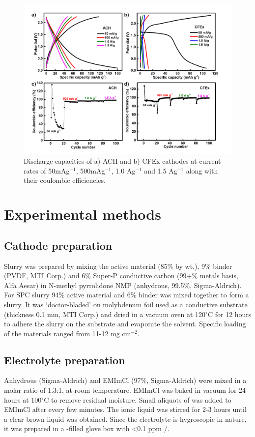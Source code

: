 \begin{figure}[tbh!]
  \centering
  \includegraphics[width=\textwidth]{Figures/chap5fig/cfexachlong}
    \caption{Discharge capacities of a) ACH and b) CFEx cathodes at current rates of 50mAg$^{-1}$, 500mAg$^{-1}$, 1.0 Ag$^{-1}$ and 1.5 Ag$^{-1}$ along with their coulombic efficiencies. }
  \label{Figures/chap5fig:cfexachlong}
\end{figure}

\section{Experimental methods}

\subsection{Cathode preparation}
Slurry was prepared by mixing the active material (85$\%$ by wt.), 9$\%$ binder (PVDF, MTI Corp.) and 6$\%$ Super-P conductive carbon (99+$\%$ metals basis, Alfa Aesar) in N-methyl pyrrolidone NMP (anhydrous, 99.5$\%$, Sigma-Aldrich). For SPC slurry 94$\%$ active material and 6$\%$ binder was mixed together to form a slurry. It was ‘doctor-bladed’ on molybdenum foil used as a conductive substrate (thickness 0.1 mm, MTI Corp.) and dried in a vacuum oven at 120$^{\circ}$C for 12 hours to adhere the slurry on the substrate and evaporate the solvent. Specific loading of the materials ranged from 11-12 mg cm$^{-2}$.

\subsection{Electrolyte preparation}
Anhydrous  (Sigma-Aldrich) and EMImCl (97$\%$, Sigma-Aldrich) were mixed in a molar ratio of 1.3:1, at room temperature. EMImCl was baked in vacuum for 24 hours at 100$^{\circ}$C to remove residual moisture. Small aliquots of  was added to EMImCl after every few minutes. The ionic liquid was stirred for 2-3 hours until a clear brown liquid was obtained. Since the electrolyte is hygroscopic in nature, it was prepared in a -filled glove box with <0.1 ppm /. 

